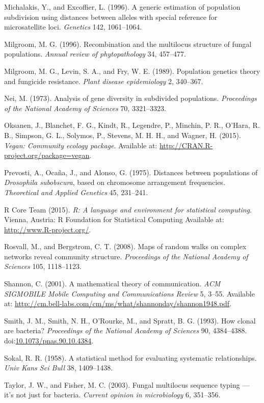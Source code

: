 \documentclass{frontiersSCNS} %
\begin{document}
Michalakis, Y., and Excoffier, L. (1996). A generic estimation of
population subdivision using distances between alleles with special
reference for microsatellite loci. \emph{Genetics} 142, 1061--1064.

Milgroom, M. G. (1996). Recombination and the multilocus structure of
fungal populations. \emph{Annual review of phytopathology} 34, 457--477.

Milgroom, M. G., Levin, S. A., and Fry, W. E. (1989). Population
genetics theory and fungicide resistance. \emph{Plant disease
epidemiology} 2, 340--367.

Nei, M. (1973). Analysis of gene diversity in subdivided populations.
\emph{Proceedings of the National Academy of Sciences} 70, 3321--3323.

Oksanen, J., Blanchet, F. G., Kindt, R., Legendre, P., Minchin, P. R.,
O'Hara, R. B., Simpson, G. L., Solymos, P., Stevens, M. H. H., and
Wagner, H. (2015). \emph{Vegan: Community ecology package}. Available
at: \url{http://CRAN.R-project.org/package=vegan}.

Prevosti, A., Oca{\~{n}}a, J., and Alonso, G. (1975). Distances between
populations of \emph{Drosophila subobscura}, based on chromosome
arrangement frequencies. \emph{Theoretical and Applied Genetics} 45,
231--241.

R Core Team (2015). \emph{R: A language and environment for statistical
computing}. Vienna, Austria: R Foundation for Statistical Computing
Available at: \url{http://www.R-project.org/}.

Rosvall, M., and Bergstrom, C. T. (2008). Maps of random walks on
complex networks reveal community structure. \emph{Proceedings of the
National Academy of Sciences} 105, 1118--1123.

Shannon, C. (2001). A mathematical theory of communication. \emph{ACM
SIGMOBILE Mobile Computing and Communications Review} 5, 3--55.
Available at:
\url{http://cm.bell-labs.com/cm/ms/what/shannonday/shannon1948.pdf}.

Smith, J. M., Smith, N. H., O'Rourke, M., and Spratt, B. G. (1993). How
clonal are bacteria? \emph{Proceedings of the National Academy of
Sciences} 90, 4384--4388.
doi:\href{http://dx.doi.org/10.1073/pnas.90.10.4384}{10.1073/pnas.90.10.4384}.

Sokal, R. R. (1958). A statistical method for evaluating systematic
relationships. \emph{Univ Kans Sci Bull} 38, 1409--1438.

Taylor, J. W., and Fisher, M. C. (2003). Fungal multilocus sequence
typing --- it's not just for bacteria. \emph{Current opinion in
microbiology} 6, 351--356.
\end{document}
